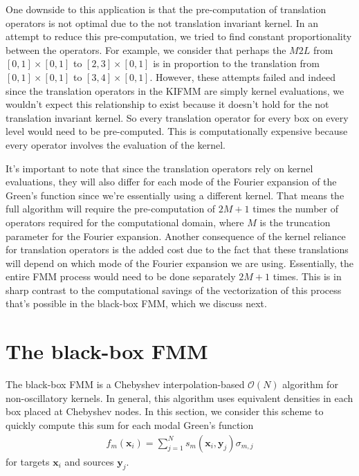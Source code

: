 \documentclass[11pt, oneside]{article}   	%
\begin{document}
One downside to this application is that the pre-computation of translation operators is not optimal due to the not translation invariant kernel. In an attempt to reduce this pre-computation, we tried to find constant proportionality between the operators. For example, we consider that perhaps the $M2L$ from $[0,1]\times[0,1]$ to $[2,3]\times[0,1]$ is in proportion to the translation from $[0,1]\times[0,1]$ to $[3,4]\times[0,1]$. However, these attempts failed and indeed since the translation operators in the KIFMM are simply kernel evaluations, we wouldn't expect this relationship to exist because it doesn't hold for the not translation invariant kernel. So every translation operator for every box on every level would need to be pre-computed. This is computationally expensive because every operator involves the evaluation of the kernel.

It's important to note that since the translation operators rely on kernel evaluations, they will also differ for each mode of the Fourier expansion of the Green's function since we're essentially using a different kernel. That means the full algorithm will require the pre-computation of $2M+1$ times the number of operators required for the computational domain, where $M$ is the truncation parameter for the Fourier expansion. Another consequence of the kernel reliance for translation operators is the added cost due to the fact that these translations will depend on which mode of the Fourier expansion we are using. Essentially, the entire FMM process would need to be done separately $2M+1$ times. This is in sharp contrast to the computational savings of the vectorization of this process that's possible in the black-box FMM, which we discuss next.

\section{The black-box FMM}
The black-box FMM is a Chebyshev interpolation-based $\mathcal{O}(N)$ algorithm for non-oscillatory kernels. In general, this algorithm uses equivalent densities in each box placed at Chebyshev nodes. In this section, we consider this scheme to quickly compute this sum for each modal Green's function
\begin{align}
f_m(\mathbf{x}_i)=\sum_{j=1}^N s_m(\mathbf{x}_i,\mathbf{y}_j)\sigma_{m,j}
\end{align}
for targets $\mathbf{x}_i$ and sources $\mathbf{y}_j$.
\end{document}
